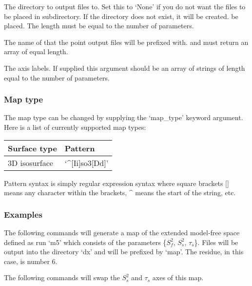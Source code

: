   The directory to output files to.  Set this to `None' if you do not want the files to be placed in subdirectory.  If the directory does not exist, it will be created.
be placed.  The length must be equal to the number of parameters.

  The name of that the point output files will be prefixed with.
and must return an array of equal length.

  The axis labels.  If supplied this argument should be an array of strings of length equal to the number of parameters.

\subsubsection{Map type}

The map type can be changed by supplying the `map\_type' keyword argument.  Here is a list of
currently supported map types:


\begin{center}
\begin{tabular}{ll}
\toprule
Surface type & Pattern \\
\midrule
 3D isosurface                              &  `\^{}[Ii]so3[Dd]'                 \\
\bottomrule
\end{tabular}
\end{center}

Pattern syntax is simply regular expression syntax where square brackets [] means any
character within the brackets, \^{} means the start of the string, etc.


\subsubsection{Examples}

The following commands will generate a map of the extended model-free space defined as run
`m5' which consists of the parameters \{$S^2_f$, $S^2_s$, $\tau_s$\}.  Files will be output into the
directory `dx' and will be prefixed by `map'.  The residue, in this case, is number 6.




The following commands will swap the $S^2_s$ and $\tau_s$ axes of this map.



